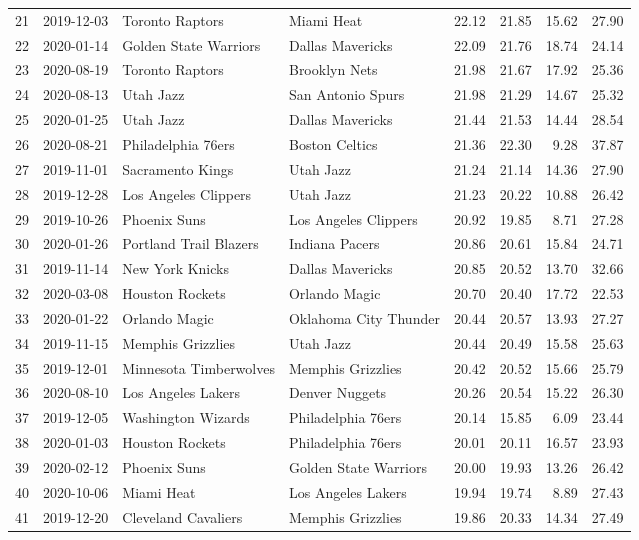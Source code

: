 \documentclass[
  11pt,
]{article}
\theoremstyle{nonumberplain}
\begin{document}
\begin{longtable}{rl|llr|rrr}
21 & 2019-12-03 & Toronto Raptors & Miami Heat & 22.12 & 21.85 & 15.62 & 27.90\\
22 & 2020-01-14 & Golden State Warriors & Dallas Mavericks & 22.09 & 21.76 & 18.74 & 24.14\\
23 & 2020-08-19 & Toronto Raptors & Brooklyn Nets & 21.98 & 21.67 & 17.92 & 25.36\\
24 & 2020-08-13 & Utah Jazz & San Antonio Spurs & 21.98 & 21.29 & 14.67 & 25.32\\
25 & 2020-01-25 & Utah Jazz & Dallas Mavericks & 21.44 & 21.53 & 14.44 & 28.54\\
26 & 2020-08-21 & Philadelphia 76ers & Boston Celtics & 21.36 & 22.30 & 9.28 & 37.87\\
27 & 2019-11-01 & Sacramento Kings & Utah Jazz & 21.24 & 21.14 & 14.36 & 27.90\\
28 & 2019-12-28 & Los Angeles Clippers & Utah Jazz & 21.23 & 20.22 & 10.88 & 26.42\\
29 & 2019-10-26 & Phoenix Suns & Los Angeles Clippers & 20.92 & 19.85 & 8.71 & 27.28\\
30 & 2020-01-26 & Portland Trail Blazers & Indiana Pacers & 20.86 & 20.61 & 15.84 & 24.71\\
31 & 2019-11-14 & New York Knicks & Dallas Mavericks & 20.85 & 20.52 & 13.70 & 32.66\\
32 & 2020-03-08 & Houston Rockets & Orlando Magic & 20.70 & 20.40 & 17.72 & 22.53\\
33 & 2020-01-22 & Orlando Magic & Oklahoma City Thunder & 20.44 & 20.57 & 13.93 & 27.27\\
34 & 2019-11-15 & Memphis Grizzlies & Utah Jazz & 20.44 & 20.49 & 15.58 & 25.63\\
35 & 2019-12-01 & Minnesota Timberwolves & Memphis Grizzlies & 20.42 & 20.52 & 15.66 & 25.79\\
36 & 2020-08-10 & Los Angeles Lakers & Denver Nuggets & 20.26 & 20.54 & 15.22 & 26.30\\
37 & 2019-12-05 & Washington Wizards & Philadelphia 76ers & 20.14 & 15.85 & 6.09 & 23.44\\
38 & 2020-01-03 & Houston Rockets & Philadelphia 76ers & 20.01 & 20.11 & 16.57 & 23.93\\
39 & 2020-02-12 & Phoenix Suns & Golden State Warriors & 20.00 & 19.93 & 13.26 & 26.42\\
40 & 2020-10-06 & Miami Heat & Los Angeles Lakers & 19.94 & 19.74 & 8.89 & 27.43\\
41 & 2019-12-20 & Cleveland Cavaliers & Memphis Grizzlies & 19.86 & 20.33 & 14.34 & 27.49\\

\end{longtable}
\end{document}

